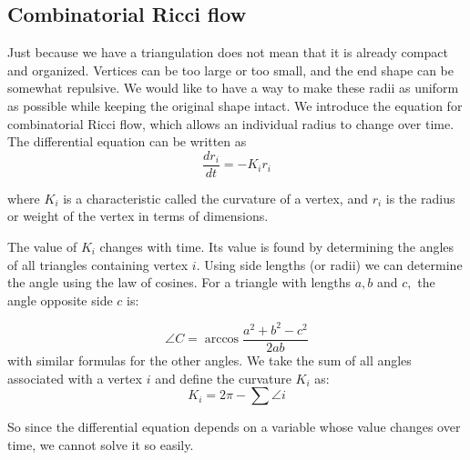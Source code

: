 \documentclass[12pt]{article}
\begin{document}
  \subsection{Combinatorial Ricci flow}
  \maketitle  
Just because we have a triangulation does not mean that it is already compact and organized. Vertices can be too large or too small, and the end shape can be somewhat repulsive. We would like to have a way to make these radii as uniform as possible while keeping the original shape intact. We introduce the equation for combinatorial Ricci flow, which allows an individual radius to change over time. The differential equation can be written as 
  \begin{equation}
  \frac{dr_i}{{dt}} = -K_ir_i
  \end{equation}
  
  where $K_i$ is a characteristic called the curvature of a vertex, and $r_i$ is the radius or weight of the vertex in terms of dimensions. 
  
  The value of $K_i$ changes with time. Its value is found by determining the angles of all triangles containing vertex $i$. Using side lengths (or radii) we can determine the angle using the law of cosines. For a triangle with lengths $a, b$ and $c,$ the angle opposite side $c$ is:
  
  \begin{equation}
  \angle C = \arccos\frac{a^2 + b^2 - c^2}{2ab}
  \end{equation} with similar formulas for the other angles. We take the sum of all angles associated with a vertex $i$ and define the curvature $K_i$ as:
  \begin{equation}
  K_i = 2\pi - \sum{\angle i}
  \end{equation}
  
  So since the differential equation depends on a variable whose value changes over time, we cannot solve it so easily.\newline
   
\end{document}
